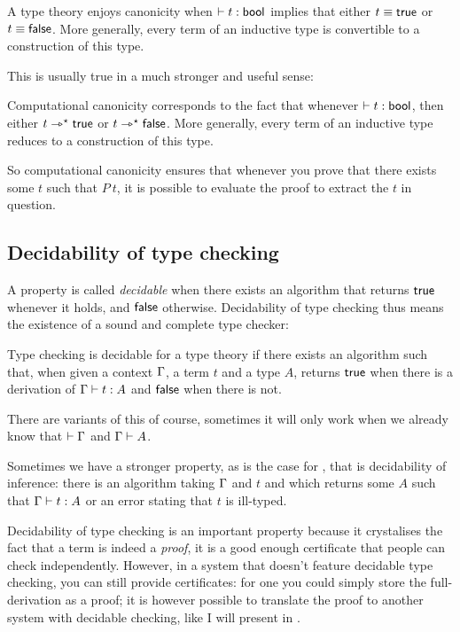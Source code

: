 \begin{definition}[Canonicity]
  A type theory enjoys canonicity when \(\vdash t : \mathsf{bool}\) implies that
  either \(t \equiv \mathsf{true}\) or \(t \equiv \mathsf{false}\).
  More generally, every term of an inductive type is convertible to a
  construction of this type.
\end{definition}

This is usually true in a much stronger and useful sense:

\begin{definition}
  Computational canonicity corresponds to the fact that whenever
  \(\vdash t : \mathsf{bool}\), then either \(t \rightarrowtriangle^{\star} \mathsf{true}\) or
  \(t \rightarrowtriangle^{\star} \mathsf{false}\).
  More generally, every term of an inductive type reduces to a construction
  of this type.
\end{definition}

So computational canonicity ensures that whenever you prove that there exists
some \(t\) such that \(P\ t\), it is possible to evaluate the proof to extract
the \(t\) in question.

\subsection{Decidability of type checking}

A property is called \emph{decidable} when there exists an algorithm that
returns \(\mathsf{true}\) whenever it holds, and \(\mathsf{false}\) otherwise.
Decidability of type checking thus means the existence of a sound and complete
type checker:

\begin{definition}
  Type checking is decidable for a type theory if there exists an algorithm
  such that, when given a context \(\Gamma\), a term \(t\) and a type \(A\),
  returns \(\mathsf{true}\) when there is a derivation of \(\Gamma \vdash t : A\)
  and \(\mathsf{false}\) when there is not.
\end{definition}

There are variants of this of course, sometimes it will only work when we
already know that \(\vdash \Gamma\) and \(\Gamma \vdash A\).

Sometimes we have a stronger property, as is the case for \Coq, that is
decidability of inference:
there is an algorithm taking \(\Gamma\) and \(t\) and which returns some \(A\)
such that \(\Gamma \vdash t : A\) or an error stating that \(t\) is ill-typed.

Decidability of type checking is an important property because it crystalises
the fact that a term is indeed a \emph{proof}, it is a good enough certificate
that people can check independently.
However, in a system that doesn't feature decidable type checking, you can still
provide certificates: for one you could simply store the full-derivation as a
proof; it is however possible to translate the proof to another system with
decidable checking, like I will present in .

